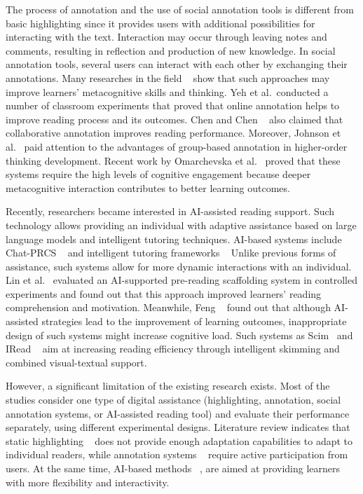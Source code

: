 \documentclass{IEEEtran}
\begin{document}
The process of annotation and the use of social annotation tools is different from basic highlighting since it provides users with additional possibilities for interacting with the text. Interaction may occur through leaving notes and comments, resulting in reflection and production of new knowledge. In social annotation tools, several users can interact with each other by exchanging their annotations. Many researches in the field ~\cite{novak2012, yeh2017, chen2014, johnson2010} show that such approaches may improve learners’ metacognitive skills and thinking. Yeh et al.~\cite{yeh2017}conducted a number of classroom experiments that proved that online annotation helps to improve reading process and its outcomes. Chen and Chen ~\cite{chen2014} also claimed that collaborative annotation improves reading performance. Moreover, Johnson et al.~\cite{johnson2010}  paid attention to the advantages of group-based annotation in higher-order thinking development. Recent work by Omarchevska et al.~\cite{omarchevska2026} proved that these systems require the high levels of cognitive engagement because deeper metacognitive interaction contributes to better learning outcomes.

Recently, researchers became interested in AI-assisted reading support. Such technology allows providing an individual with adaptive assistance based on large language models and intelligent tutoring techniques. AI-based systems include Chat-PRCS ~\cite{wang2024} and intelligent tutoring frameworks ~\cite{xu2019, wijekumar2013} Unlike previous forms of assistance, such systems allow for more dynamic interactions with an individual. Lin et al.~\cite{lin2025} evaluated an AI-supported pre-reading scaffolding system in controlled experiments and found out that this approach improved learners' reading comprehension and motivation. Meanwhile, Feng ~\cite{feng2025}  found out that although AI-assisted strategies lead to the improvement of learning outcomes, inappropriate design of such systems might increase cognitive load. Such systems as Scim ~\cite{fok2023}and IRead ~\cite{zhang2025} aim at increasing reading efficiency through intelligent skimming and combined visual-textual support.

However, a significant limitation of the existing research exists. Most of the studies consider one type of digital assistance (highlighting, annotation, social annotation systems, or AI-assisted reading tool) and evaluate their performance separately, using different experimental designs. Literature review indicates that static highlighting ~\cite{ponce2022, mason2024, list2023} does not provide enough adaptation capabilities to adapt to individual readers, while annotation systems ~\cite{novak2012, chen2014} require active participation from users. At the same time, AI-based methods ~\cite{lin2025, wang2024, zhang2025}, are aimed at providing learners with more flexibility and interactivity.
\end{document}
